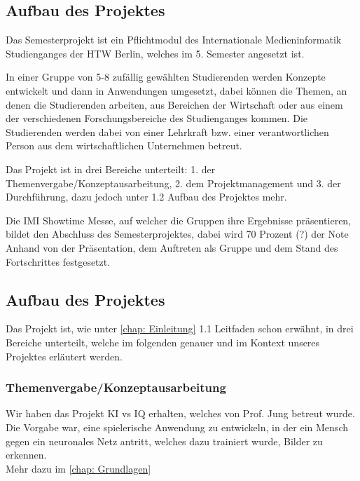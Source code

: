 \documentclass[11pt]{article}
\begin{document}
\subsection{Aufbau des Projektes}
\label{chap: Aufbau}

Das Semesterprojekt ist ein Pflichtmodul des Internationale Medieninformatik Studienganges der HTW Berlin, welches im 5. Semester angesetzt ist.

In einer Gruppe von 5-8 zufällig gewählten Studierenden werden Konzepte entwickelt und dann in Anwendungen umgesetzt, dabei können die Themen, an denen die Studierenden arbeiten, aus Bereichen der Wirtschaft oder aus einem der verschiedenen Forschungsbereiche des Studienganges kommen.
Die Studierenden werden dabei von einer Lehrkraft bzw. einer verantwortlichen Person aus dem wirtschaftlichen Unternehmen betreut.

Das Projekt ist in drei Bereiche unterteilt: 1. der Themenvergabe/Konzeptausarbeitung, 2. dem Projektmanagement und 3. der Durchführung, dazu jedoch unter 1.2 Aufbau des Projektes mehr.

Die IMI Showtime Messe, auf welcher die Gruppen ihre Ergebnisse präsentieren, bildet den Abschluss des Semesterprojektes, dabei wird 70 Prozent (?) der Note Anhand von der Präsentation, dem Auftreten als Gruppe und dem Stand des Fortschrittes festgesetzt.
\subsection{Aufbau des Projektes}

Das Projekt ist, wie unter \autoref{chap: Einleitung} 1.1 Leitfaden schon erwähnt, in drei Bereiche unterteilt, welche im folgenden genauer und im Kontext unseres Projektes erläutert werden.

\subsubsection{ Themenvergabe/Konzeptausarbeitung }
\label{chap: Themenvergabe}

Wir haben das Projekt KI vs IQ erhalten, welches von Prof. Jung 		betreut wurde.\\
Die Vorgabe war, eine spielerische Anwendung zu entwickeln, 			in der ein Mensch gegen ein neuronales Netz antritt, welches 			dazu trainiert wurde, Bilder zu erkennen.\\
Mehr dazu im \autoref{chap: Grundlagen}
	
\end{document}
